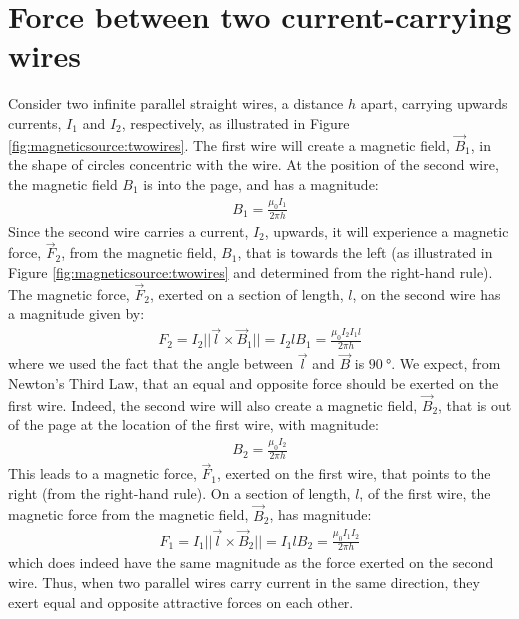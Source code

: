 \section{Force between two current-carrying wires}
Consider two infinite parallel straight wires, a distance $h$ apart, carrying upwards currents, $I_1$ and $I_2$, respectively, as illustrated in Figure \ref{fig:magneticsource:twowires}.
The first wire will create a magnetic field, $\vec B_1$, in the shape of circles concentric with the wire. At the position of the second wire, the magnetic field $B_1$ is into the page, and has a magnitude:
\begin{align*}
B_1 = \frac{\mu_0 I_1}{2\pi h}
\end{align*} 
Since the second wire carries a current, $I_2$, upwards, it will experience a magnetic force, $\vec F_2$, from the magnetic field, $B_1$, that is towards the left (as illustrated in Figure \ref{fig:magneticsource:twowires} and determined from the right-hand rule). The magnetic force, $\vec F_2$, exerted on a section of length, $l$, on the second wire has a magnitude given by:
\begin{align*}
F_2 = I_2 ||\vec l \times \vec B_1||=I_2 l B_1 =\frac{\mu_0 I_2 I_1 l}{2\pi h}
\end{align*}
where we used the fact that the angle between $\vec l$ and $\vec B$ is $\SI{90}{\degree}$. We expect, from Newton's Third Law, that an equal and opposite force should be exerted on the first wire. Indeed, the second wire will also create a magnetic field, $\vec B_2$, that is out of the page at the location of the first wire, with magnitude:
\begin{align*}
B_2 = \frac{\mu_0 I_2}{2\pi h}
\end{align*}
This leads to a magnetic force, $\vec F_1$, exerted on the first wire, that points to the right (from the right-hand rule). On a section of length, $l$, of the first wire, the magnetic force from the magnetic field, $\vec B_2$, has magnitude:
\begin{align*}
F_1 = I_1 ||\vec l \times \vec B_2||=I_1 l B_2 =\frac{\mu_0 I_1 I_2}{2\pi h}
\end{align*}
which does indeed have the same magnitude as the force exerted on the second wire. Thus, when two parallel wires carry current in the same direction, they exert equal and opposite attractive forces on each other. 
